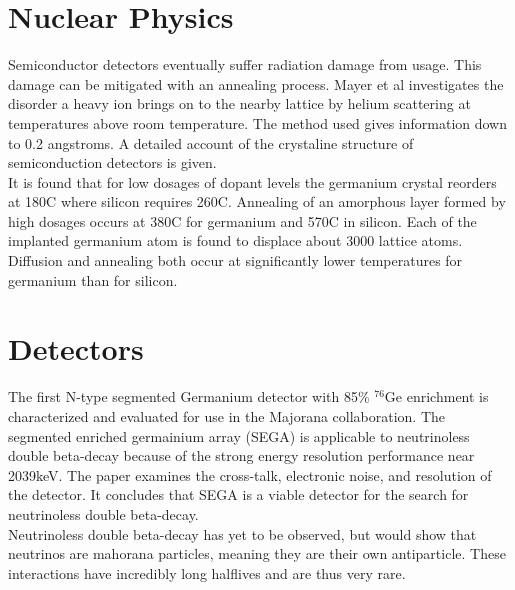 \documentclass[12pt]{article}
\begin{document}
\section{Nuclear Physics}   %

{\large\textbf{\cite{Mayer}}}

Semiconductor detectors eventually suffer radiation damage from usage. This damage can be mitigated with an annealing process. Mayer et al investigates the disorder a heavy ion brings on to the nearby lattice by helium scattering at temperatures above room temperature. The method used gives information down to 0.2 angstroms. A detailed account of the crystaline structure of semiconduction detectors is given.
\\
It is found that for low dosages of dopant levels the germanium crystal reorders at 180C where silicon requires 260C. Annealing of an amorphous layer formed by high dosages occurs at 380C for germanium and 570C in silicon. Each of the implanted germanium atom is found to displace about 3000 lattice atoms. Diffusion and annealing both occur at significantly lower temperatures for germanium than for silicon.
\\[20pt]


\section{Detectors}   %

{\large\textbf{\cite{Leviner201466}}}

The first N-type segmented Germanium detector with 85\% $^{76}\mbox{Ge}$ enrichment is characterized and evaluated for use in the Majorana collaboration. The segmented enriched germainium array (SEGA) is applicable to neutrinoless double beta-decay because of the strong energy resolution performance near 2039keV. The paper examines the cross-talk, electronic noise, and resolution of the detector. It concludes that SEGA is a viable detector for the search for neutrinoless double beta-decay.
\\
Neutrinoless double beta-decay has yet to be observed, but would show that neutrinos are mahorana particles, meaning they are their own antiparticle. These interactions have incredibly long halflives and are thus very rare.
\\[20pt]


{\large\textbf{\cite{Sangsingkeow2003183}}}
\end{document}

